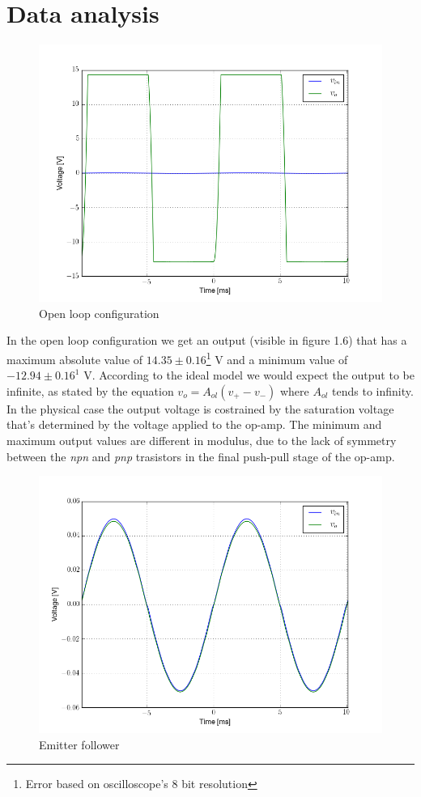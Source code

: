 \section{Data analysis}
\begin{figure}[H]
\centering
\includegraphics[width=.7\textwidth]{1/scope1.png}
\caption{Open loop configuration}
\end{figure}
In the open loop configuration we get an output (visible in figure 1.6) that has a maximum absolute value of $14.35\pm 0.16$\footnote{Error based on oscilloscope's 8 bit resolution} V and a minimum value of $-12.94\pm 0.16^1$ V. According to the ideal model we would expect the output to be infinite, as stated by the equation $v_o = A_{ol}(v_+-v_-)$ where $A_{ol}$ tends to infinity. In the physical case the output voltage is costrained by the saturation voltage that's determined by the voltage applied to the op-amp.
The minimum and maximum output values are different in modulus, due to the lack of symmetry between the \emph{npn} and \emph{pnp} trasistors in the final push-pull stage of the op-amp. 
\begin{figure}[H]
\centering
\includegraphics[width=.7\textwidth]{1/scope2.png}
\caption{Emitter follower}
\end{figure}

